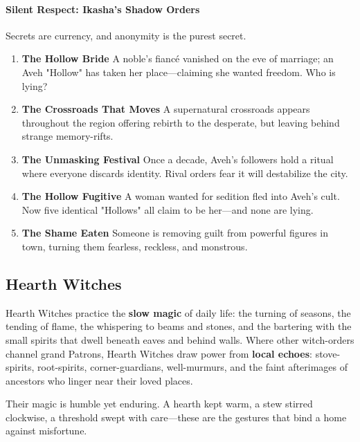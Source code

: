 \documentclass[11pt]{book}
\begin{document}
\paragraph{Silent Respect: Ikasha's Shadow Orders}
Secrets are currency, and anonymity is the purest secret.

\begin{enumerate}[leftmargin=*]
    \item \textbf{The Hollow Bride}  
    A noble's fiancé vanished on the eve of marriage;  
    an Aveh "Hollow" has taken her place---claiming she wanted freedom.  
    Who is lying?

    \item \textbf{The Crossroads That Moves}  
    A supernatural crossroads appears throughout the region  
    offering rebirth to the desperate,  
    but leaving behind strange memory-rifts.

    \item \textbf{The Unmasking Festival}  
    Once a decade, Aveh's followers hold a ritual where everyone discards identity.  
    Rival orders fear it will destabilize the city.

    \item \textbf{The Hollow Fugitive}  
    A woman wanted for sedition fled into Aveh's cult.  
    Now five identical "Hollows" all claim to be her---and none are lying.

    \item \textbf{The Shame Eaten}  
    Someone is removing guilt from powerful figures in town,  
    turning them fearless, reckless, and monstrous.
\end{enumerate}

\subsection{Hearth Witches}

Hearth Witches practice the \textbf{slow magic} of daily life: the turning of seasons, the tending of flame, the whispering to beams and stones, and the bartering with the small spirits that dwell beneath eaves and behind walls.  
Where other witch-orders channel grand Patrons, Hearth Witches draw power from \textbf{local echoes}: stove-spirits, root-spirits, corner-guardians, well-murmurs, and the faint afterimages of ancestors who linger near their loved places.

Their magic is humble yet enduring.  
A hearth kept warm, a stew stirred clockwise, a threshold swept with care---these are the gestures that bind a home against misfortune.
\end{document}
